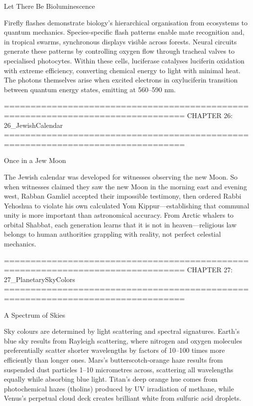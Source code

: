 Let There Be Bioluminescence

Firefly flashes demonstrate biology's hierarchical organisation from ecosystems to quantum mechanics. Species-specific flash patterns enable mate recognition and, in tropical swarms, synchronous displays visible across forests. Neural circuits generate these patterns by controlling oxygen flow through tracheal valves to specialised photocytes. Within these cells, luciferase catalyses luciferin oxidation with extreme efficiency, converting chemical energy to light with minimal heat. The photons themselves arise when excited electrons in oxyluciferin transition between quantum energy states, emitting at 560–590 nm.


================================================================================
CHAPTER 26: 26_JewishCalendar
================================================================================

Once in a Jew Moon

The Jewish calendar was developed for witnesses observing the new Moon. So when witnesses claimed they saw the new Moon \QSOpen{}in the morning east and evening west,\QSClose{} Rabban Gamliel accepted their impossible testimony, then ordered Rabbi Yehoshua to violate his own calculated Yom Kippur—establishing that communal unity is more important than astronomical accuracy. From Arctic whalers to orbital Shabbat, each generation learns that \QSOpen{}it is not in heaven\QSClose{}—religious law belongs to human authorities grappling with reality, not perfect celestial mechanics.


================================================================================
CHAPTER 27: 27_PlanetarySkyColors
================================================================================

A Spectrum of Skies

Sky colours are determined by light scattering and spectral signatures. Earth's blue sky results from Rayleigh scattering, where nitrogen and oxygen molecules preferentially scatter shorter wavelengths by factors of 10–100 times more efficiently than longer ones. Mars's butterscotch-orange haze results from suspended dust particles 1–10 micrometres across, scattering all wavelengths equally while absorbing blue light. Titan's deep orange hue comes from photochemical hazes (tholins) produced by UV irradiation of methane, while Venus's perpetual cloud deck creates brilliant white from sulfuric acid droplets.


